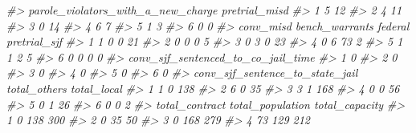 \documentclass[
]{krantz}
\makeatletter
\newenvironment{Shaded}{\begin{snugshade}}{\end{snugshade}}
\newcommand{\CommentTok}[1]{\textcolor[rgb]{0.37,0.37,0.37}{\textit{#1}}}
\newenvironment{kframe}{%
\medskip{}
\setlength{\fboxsep}{.8em}
 \def\at@end@of@kframe{}%
 \ifinner\ifhmode%
  \def\at@end@of@kframe{\end{minipage}}%
  \begin{minipage}{\columnwidth}%
 \fi\fi%
 \def\FrameCommand##1{\hskip\@totalleftmargin \hskip-\fboxsep
 \colorbox{shadecolor}{##1}\hskip-\fboxsep
     \hskip-\linewidth \hskip-\@totalleftmargin \hskip\columnwidth}%
 \MakeFramed {\advance\hsize-\width
   \@totalleftmargin\z@ \linewidth\hsize
   \@setminipage}}%
 {\par\unskip\endMakeFramed%
 \at@end@of@kframe}
\renewenvironment{Shaded}{\begin{kframe}}{\end{kframe}}
\makeatother
\begin{document}
\begin{Shaded}
\begin{Highlighting}[]
\CommentTok{\#\textgreater{}   parole\_violators\_with\_a\_new\_charge pretrial\_misd}
\CommentTok{\#\textgreater{} 1                                  5            12}
\CommentTok{\#\textgreater{} 2                                  4            11}
\CommentTok{\#\textgreater{} 3                                  0            14}
\CommentTok{\#\textgreater{} 4                                  6             7}
\CommentTok{\#\textgreater{} 5                                  1             3}
\CommentTok{\#\textgreater{} 6                                  0             0}
\CommentTok{\#\textgreater{}   conv\_misd bench\_warrants federal pretrial\_sjf}
\CommentTok{\#\textgreater{} 1         1              0       0           21}
\CommentTok{\#\textgreater{} 2         0              0       0            5}
\CommentTok{\#\textgreater{} 3         0              3       0           23}
\CommentTok{\#\textgreater{} 4         0              6      73            2}
\CommentTok{\#\textgreater{} 5         1              1       2            5}
\CommentTok{\#\textgreater{} 6         0              0       0            0}
\CommentTok{\#\textgreater{}   conv\_sjf\_sentenced\_to\_co\_jail\_time}
\CommentTok{\#\textgreater{} 1                                  0}
\CommentTok{\#\textgreater{} 2                                  0}
\CommentTok{\#\textgreater{} 3                                  0}
\CommentTok{\#\textgreater{} 4                                  0}
\CommentTok{\#\textgreater{} 5                                  0}
\CommentTok{\#\textgreater{} 6                                  0}
\CommentTok{\#\textgreater{}   conv\_sjf\_sentence\_to\_state\_jail total\_others total\_local}
\CommentTok{\#\textgreater{} 1                               1            0         138}
\CommentTok{\#\textgreater{} 2                               6            0          35}
\CommentTok{\#\textgreater{} 3                               3            1         168}
\CommentTok{\#\textgreater{} 4                               0            0          56}
\CommentTok{\#\textgreater{} 5                               0            1          26}
\CommentTok{\#\textgreater{} 6                               0            0           2}
\CommentTok{\#\textgreater{}   total\_contract total\_population total\_capacity}
\CommentTok{\#\textgreater{} 1              0              138            300}
\CommentTok{\#\textgreater{} 2              0               35             50}
\CommentTok{\#\textgreater{} 3              0              168            279}
\CommentTok{\#\textgreater{} 4             73              129            212}

\end{Highlighting}
\end{Shaded}
\end{document}
